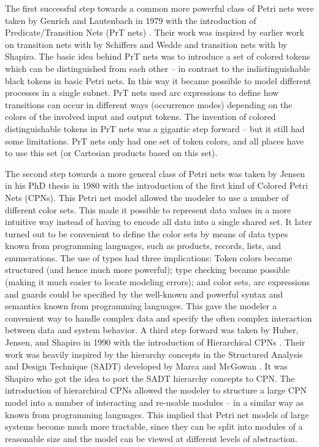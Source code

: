 The first successful step towards a common more powerful class of
Petri nets were taken by Genrich and Lautenbach in 1979 with the
introduction of Predicate/Transition Nets (PrT nets)
\cite{genrich:81}. Their work was inspired by earlier work on
transition nets with  by Schiffers and Wedde
\cite{schiffers:78} and transition nets with  \cite{Y} by Shapiro. The basic idea behind PrT nets was
to introduce a set of colored tokens which can be distinguished from
each other -- in contrast to the indistinguishable black tokens in
basic Petri nets. In this way it became possible to model different
processes in a single subnet. PrT nets used arc expressions to define
how transitions can occur in different ways (occurrence modes)
depending on the colors of the involved input and output tokens. The
invention of colored distinguishable tokens in PrT nets was a gigantic
step forward -- but it still had some limitations. PrT nets only had
one set of token colors, and all places have to use this set (or
Cartesian products based on this set).

The second step towards a more general class of Petri nets was taken
by Jensen in his PhD thesis in 1980 \cite{jensen:81} with the
introduction of the first kind of Colored Petri Nets (CPNs). This
Petri net model allowed the modeler to use a number of different color
sets. This made it possible to represent data values in a more
intuitive way instead of having to encode all data into a single
shared set. It later turned out to be convenient to define the color
sets by means of data types known from programming languages, such as
products, records, lists, and enumerations. The use of types had three
implications: Token colors became structured (and hence much more
powerful); type checking became possible (making it much easier to
locate modeling errors); and color sets, arc expressions and guards
could be specified by the well-known and powerful syntax and semantics
known from programming languages. This gave the modeler a convenient
way to handle complex data and specify the often complex interaction
between data and system behavior. A third step forward was taken by
Huber, Jensen, and Shapiro in 1990 with the introduction of
Hierarchical CPNs \cite{huber:91}. Their work was heavily inspired by
the hierarchy concepts in the Structured Analysis and Design Technique
(SADT) developed by Marca and McGowan \cite{sadt}. It was Shapiro who got
the idea to port the SADT hierarchy concepts to CPN.  The introduction
of hierarchical CPNs allowed the modeler to structure a large CPN
model into a number of interacting and re-usable modules -- in a
similar way as known from programming languages. This implied that
Petri net models of large systems become much more tractable, since
they can be split into modules of a reasonable size and the model can
be viewed at different levels of abstraction.


